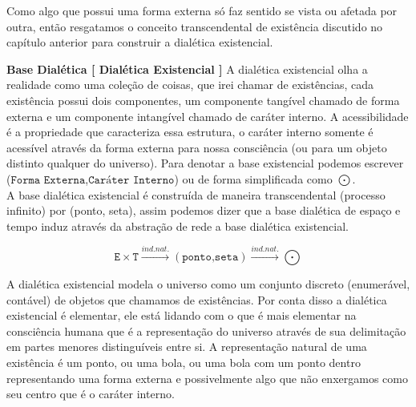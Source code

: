 \documentclass[10pt,a4paper]{report}
\begin{document}
Como algo que possui uma forma externa só faz sentido se vista ou afetada por outra, então resgatamos o conceito transcendental de existência discutido no capítulo anterior para construir a dialética existencial.

\hspace{\baselineskip}

\textbf{Base Dialética [ Dialética Existencial ]} A dialética existencial olha a realidade como uma coleção de coisas, que irei chamar de existências, cada existência possui dois componentes, um componente tangível chamado de forma externa e um componente intangível chamado de caráter interno. A acessibilidade é a propriedade que caracteriza essa estrutura, o caráter interno somente é acessível através da forma externa para nossa consciência (ou para um objeto distinto qualquer do universo). Para denotar a base existencial podemos escrever ($\texttt{Forma Externa}$,$\texttt{Caráter Interno}$) ou de forma simplificada como $\bigodot$. \\



A base dialética existencial é construída de maneira transcendental (processo infinito) por (ponto, seta), assim podemos dizer que a base dialética de espaço e tempo induz através da abstração de rede a base dialética existencial.

$$ \texttt{E} \times \texttt{T} \overset{ind.nat.}{\rightarrow} (\texttt{ponto,seta}) \overset{ind.nat.}{\rightarrow} \bigodot $$


A dialética existencial modela o universo como um conjunto discreto (enumerável, contável) de objetos que chamamos de existências. Por conta disso a dialética existencial é elementar, ele está lidando com o que é mais elementar na consciência humana que é a representação do universo através de sua delimitação em partes menores distinguíveis entre si. A representação natural de uma existência é um ponto, ou uma bola, ou uma bola com um ponto dentro representando uma forma externa e possivelmente algo que não enxergamos como seu centro que é o caráter interno.


\end{document}
